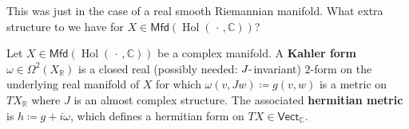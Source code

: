 \begin{remark}

This was just in the case of a real smooth Riemannian manifold. What
extra structure to we have for
\(X \in {\mathsf{Mfd}}(\mathop{\mathrm{Hol}}({\,\cdot\,}, {\mathbb{C}}) )\)?

\end{remark}

\begin{definition}

Let
\(X\in {\mathsf{Mfd}}( \mathop{\mathrm{Hol}}({\,\cdot\,}, {\mathbb{C}}) )\)
be a complex manifold. A \textbf{Kahler form}
\(\omega\in \Omega^2(X_{\mathbb{R}})\) is a closed real (possibly
needed: \(J{\hbox{-}}\)invariant) 2-form on the underlying real manifold
of \(X\) for which \(\omega(v, Jw) \coloneqq g(v, w)\) is a metric on
\(TX_{\mathbb{R}}\) where \(J\) is an almost complex structure. The
associated \textbf{hermitian metric} is \(h\coloneqq g + i \omega\),
which defines a hermitian form on
\(TX \in {\mathsf{Vect}}_{\mathbb{C}}\).

\end{definition}

